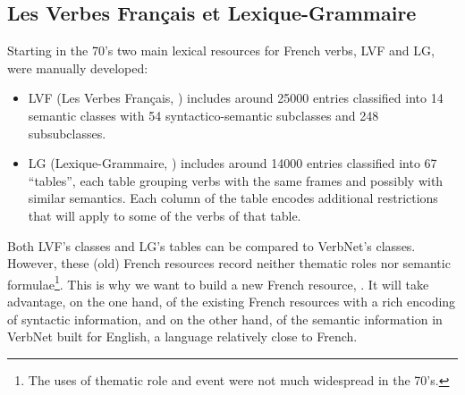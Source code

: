 
\subsection{Les Verbes Français et Lexique-Grammaire}

Starting in the 70's two main lexical resources for French verbs, LVF and LG,
were manually developed:


\begin{itemize}

    \item LVF (Les Verbes Français, \cite{dubois1997verbes}) includes around
    25000 entries classified into 14 semantic classes with 54 syntactico-semantic
    subclasses and 248 subsubclasses.

    \item LG (Lexique-Grammaire, \cite{gross1975methodes,boons1976structure})
    includes around 14000 entries classified into 67 ``tables'', each table
    grouping verbs with the same frames and possibly with similar semantics. Each
    column of the table encodes additional restrictions that will apply to some of
    the verbs of that table.


\end{itemize}

Both LVF's classes and LG's tables can be compared to VerbNet's classes.
However, these (old) French resources record neither thematic roles nor
semantic formulae\footnote{The uses of thematic role and event were not
much widespread in the 70's.}. This is why we want to build a new French
resource, \verbenet{}. It will take advantage, on the one hand, of the existing
French resources with a rich encoding of syntactic information, and on the
other hand, of the semantic information in VerbNet built for English, a
language relatively close to French.

